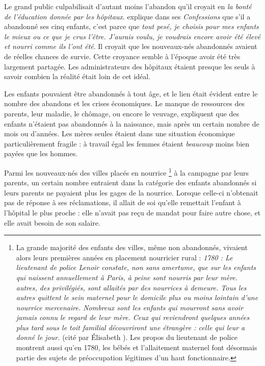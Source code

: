  Le grand public culpabilisait d'autant moins l'abandon qu'il croyait en \emph{la bonté de l'éducation donnée par les hôpitaux}.  explique dans ses \emph{Confessions} que s'il a abandonné ses cinq enfants, c'est parce que \emph{tout pesé, je choisis pour mes enfants le mieux ou ce que je crus l'être. J'aurais voulu, je voudrais encore avoir été élevé et nourri comme ils l'ont été}. Il croyait que les nouveaux-nés abandonnés avaient de réelles chances de survie. Cette croyance semble à l'époque avoir été très largement partagée. Les administrateurs des hôpitaux étaient presque les seuls à savoir combien la réalité était loin de cet idéal. 

 Les enfants pouvaient être abandonnés à tout âge, et le lien était évident entre le nombre des abandons et les crises économiques. Le manque de ressources des parents, leur maladie, le chômage, ou encore le veuvage, expliquent que des enfants n'étaient pas abandonnés à la naissance, mais après un certain nombre de mois ou d'années. Les mères seules étaient dans une situation économique particulièrement fragile : à travail égal les femmes étaient \emph{beaucoup} moins bien payées que les hommes. 



 Parmi les nouveaux-nés des villes placés en nourrice%
\footnote{La grande majorité des enfants des villes, même non abandonnés, vivaient alors leurs premières années en placement nourricier rural : \emph{1780 : Le lieutenant de police Lenoir constate, non sans amertume, que sur les  enfants qui naissent annuellement à Paris,  à peine sont nourris par leur mère.  autres, des privilégiés, sont allaités par des nourrices à demeure. Tous les autres quittent le sein maternel pour le domicile plus ou moins lointain d'une nourrice mercenaire. Nombreux sont les enfants qui mourront sans avoir jamais connu le regard de leur mère. Ceux qui reviendront quelques années plus tard sous le toit familial découvriront une étrangère : celle qui leur a donné le jour.} (cité par Élisabeth ). Les propos du lieutenant de police montrent aussi qu'en 1780, les bébés et l'allaitement maternel font désormais partie des sujets de préoccupation légitimes d'un haut fonctionnaire.} 
à la campagne par leurs parents, un certain nombre entraient dans la catégorie des enfants abandonnés si leurs parents ne payaient plus les gages de la nourrice. Lorsque celle-ci n'obtenait pas de réponse à ses réclamations, il allait de soi qu'elle remettait l'enfant à l'hôpital le plus proche : elle n'avait pas reçu de mandat pour faire autre chose, et elle avait besoin de son salaire. 




